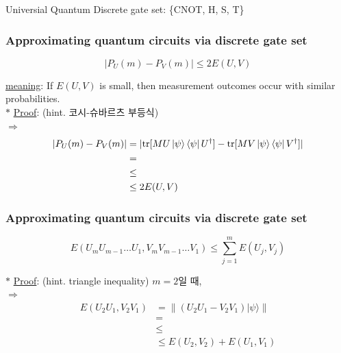 \documentclass[9pt]{beamer}
\begin{document}
\begin{section}{Universial Quantum Discrete gate set: \{CNOT, H, S, T\}}
\begin{frame}
        \end{frame}

        \begin{frame}
            \frametitle{Approximating quantum circuits via discrete gate set}
                \begin{theorem}\label{thr:gate-error}
                    $$ \left|P_U(m)-P_V(m)\right| \leq 2 E(U, V) $$
                \end{theorem}
                \vspace{0.2cm}
                \checkmark \underline{meaning}: If $E(U, V )$ is small, then measurement outcomes occur with similar probabilities.
                \vspace{0.2cm}
                \\$\ast$ \underline{Proof}: (hint. 코시-슈바르츠 부등식)
                \\$\Rightarrow$
                \begin{align*}
                    \left|P_U(m)-P_V(m)\right| &= |\text{tr}[M U\ket \psi \bra \psi U^\dagger] - \text{tr}[M V\ket \psi \bra \psi V^\dagger]| 
                    \\ &=
                    \\ &\le
                    \\ &\le 2E(U,V)
                \end{align*}

        
        \end{frame}

        \begin{frame}
            \frametitle{Approximating quantum circuits via discrete gate set}
                \begin{theorem}\label{thr:circuit-error}
                    $$ E\left(U_m U_{m-1} \ldots U_1, V_m V_{m-1} \ldots V_1\right) \leq \sum_{j=1}^m E\left(U_j, V_j\right)$$
                \end{theorem}
                \vspace{0.2cm}
                $\ast$ \underline{Proof}: (hint. triangle inequality) $m=2$일 때, 
                \\$\Rightarrow$
                \begin{align*}
                    E\left(U_2 U_1, V_2 V_1\right) & =\|\left(U_2 U_1-V_2 V_1\right)|\psi\rangle \| 
                    \\ &=
                    \\ &\le
                    \\ &\le E(U_2,V_2) + E(U_1, V_1)
                \end{align*}
        

\end{frame}
\end{section}
\end{document}
